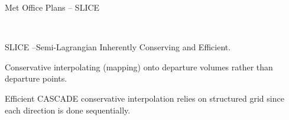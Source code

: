 \begin{slide}{Met Office Plans -- SLICE}

\ \\
\begin{list0}
\item SLICE --Semi-Lagrangian Inherently Conserving and Efficient.
\item Conservative interpolating (mapping) onto departure volumes rather than departure points.
\item Efficient CASCADE conservative interpolation relies on structured grid since each direction is done sequentially.
\end{list0}
\end{slide}

